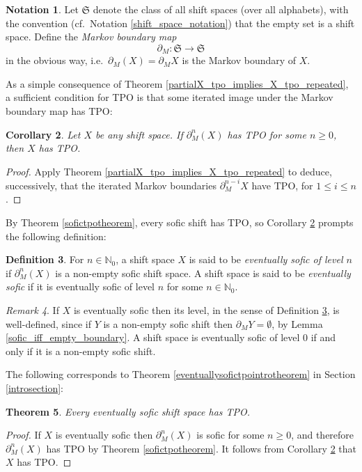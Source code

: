 \documentclass[reqno,11pt]{amsart}
\newtheorem{thm}{Theorem}[section]
\newtheorem{cor}[thm]{Corollary}
\theoremstyle{definition}
\newtheorem{defn}[thm]{Definition}
\newtheorem{notation}[thm]{Notation}
\theoremstyle{remark}
\theoremstyle{remark}
\newtheorem{rem}[thm]{Remark}
\def \N {\mathbb N}
\def\s{\mathfrak{S}}
\numberwithin{equation}{section}
\begin{document}
\begin{notation}
Let $\s$ denote the class of all shift spaces (over all alphabets),
with the convention (cf.~Notation \ref{shift_space_notation}) that the empty set is a shift space.
Define the  \emph{Markov boundary map}
$$
\partial_M : \s\to\s
$$
in the obvious way, 
i.e.~$\partial_M(X)=\partial_M X$ is the Markov boundary of $X$.
\end{notation}


As a simple consequence of Theorem \ref{partialX_tpo_implies_X_tpo_repeated},
a sufficient condition for TPO is that
 some iterated image under the Markov boundary map has TPO:

\begin{cor}\label{iteration_markov_boundary_tpo}
Let $X$ be any shift space.
If $\partial_M^{n} (X)$ has TPO for some $n\ge0$, then $X$ has TPO.
\end{cor}
\begin{proof}
Apply Theorem \ref{partialX_tpo_implies_X_tpo_repeated} 
to deduce, successively,
that the iterated Markov boundaries $\partial^{n-i}_M X$ have TPO, for $1\le i\le n$. 
\end{proof}

By Theorem \ref{sofictpotheorem}, every sofic shift has TPO,
so Corollary \ref{iteration_markov_boundary_tpo} prompts the following definition:

\begin{defn} \label{presofic_defn}
For $n\in\N_0$,
a shift space $X$ is said to be
\emph{eventually sofic of level $n$}
if $\partial_M^{n} (X)$ is a non-empty sofic shift space.
A shift space is said to be
\emph{eventually sofic} if it is
eventually sofic of level $n$
 for some $n\in\N_0$.
\end{defn}

\begin{rem}
If $X$ is eventually sofic then its level, in the sense of Definition \ref{presofic_defn},
is well-defined, since if $Y$ is a non-empty sofic shift then $\partial_M Y=\emptyset$,
by Lemma \ref{sofic_iff_empty_boundary}.
A shift space is eventually sofic of level 0 if and only if it is a non-empty sofic shift.
\end{rem}

The following corresponds to Theorem \ref{eventuallysofictpointrotheorem} in Section \ref{introsection}:

\begin{thm}\label{pre_sofic_theorem}
Every eventually sofic shift space has TPO.
\end{thm}
\begin{proof}
If $X$ is eventually sofic then  $\partial_M^{n} (X)$ is sofic for some $n\ge0$,
and therefore  $\partial_M^{n} (X)$ has TPO
by Theorem \ref{sofictpotheorem}.
It follows from Corollary \ref{iteration_markov_boundary_tpo} that $X$ has TPO.
\end{proof}
\end{document}
